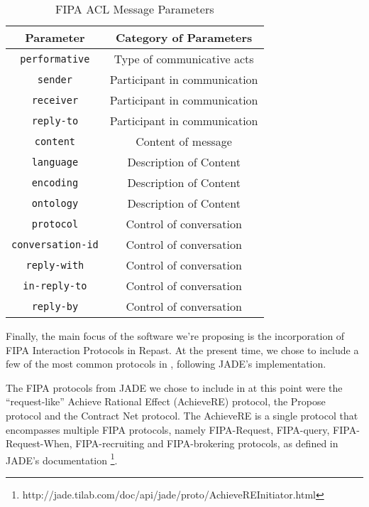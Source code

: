 \begin{table}[h]
	\normalsize
	\caption{FIPA ACL Message Parameters}
	\label{tab:fipaACLMessage}
	\begin{center}
		\begin{tabular}{cc}
		\hline
		\textbf{Parameter} & \textbf{Category of Parameters} \\
		\hline
		\texttt{performative} & Type of communicative acts \\
		\hline
		\texttt{sender} & Participant in communication \\
		\hline
		\texttt{receiver} & Participant in communication \\
		\hline
		\texttt{reply-to} & Participant in communication \\
		\hline
		\texttt{content} & Content of message \\
		\hline
		\texttt{language} & Description of Content \\
		\hline
		\texttt{encoding} & Description of Content \\
		\hline
		\texttt{ontology} & Description of Content \\
		\hline
		\texttt{protocol} & Control of conversation \\
		\hline
		\texttt{conversation-id} & Control of conversation \\
		\hline
		\texttt{reply-with} & Control of conversation \\
		\hline
		\texttt{in-reply-to} & Control of conversation \\
		\hline
		\texttt{reply-by} & Control of conversation \\
		\end{tabular}
	\end{center}
\end{table} 

Finally, the main focus of the software we're proposing is the incorporation of FIPA Interaction Protocols in Repast. At the present time, we chose to include a few of the most common protocols in \apiname{}, following JADE's implementation.

The FIPA protocols from JADE we chose to include in \apiname{} at this point were the ``request-like'' Achieve Rational Effect (AchieveRE) protocol, the Propose protocol and the Contract Net protocol. The AchieveRE is a single protocol that encompasses multiple FIPA protocols, namely FIPA-Request, FIPA-query, FIPA-Request-When, FIPA-recruiting and FIPA-brokering protocols, as defined in JADE's documentation \footnote{http://jade.tilab.com/doc/api/jade/proto/AchieveREInitiator.html}.



